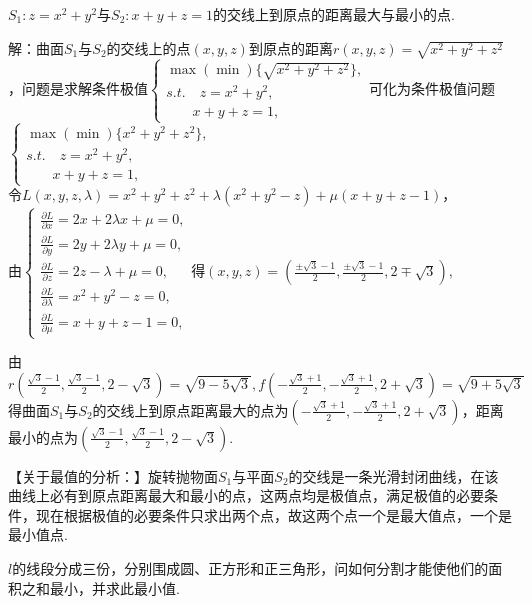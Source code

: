 \documentclass[12pt,UTF8]{ctexart}
\begin{document}
\begin{enumerate}
$S_1:z=x^2+y^2$与$S_2:x+y+z=1$的交线上到原点的距离最大与最小的点.

解：曲面$S_1$与$S_2$的交线上的点$(x,y,z)$到原点的距离$r(x,y,z)=\sqrt{x^2+y^2+z^2}$，问题是求解条件极值$\begin{cases}
\max(\min)\{\sqrt{x^2+y^2+z^2}\},\\
s.t.\quad z=x^2+y^2,\\
\ \ \ \ \quad x+y+z=1,
\end{cases}$可化为条件极值问题$\begin{cases}
\max(\min)\{x^2+y^2+z^2\},\\
s.t.\quad z=x^2+y^2,\\
\ \ \ \ \quad x+y+z=1,
\end{cases}$\\
令$L(x,y,z,\lambda)=x^2+y^2+z^2+\lambda(x^2+y^2-z)+\mu(x+y+z-1)$，\\
由$\begin{cases}
\frac{\partial L}{\partial x}=2x+2\lambda x+\mu=0,\\
\frac{\partial L}{\partial y}=2y+2\lambda y+\mu=0,\\
\frac{\partial L}{\partial z}=2z-\lambda+\mu=0,\\
\frac{\partial L}{\partial\lambda}=x^2+y^2-z=0,\\
\frac{\partial L}{\partial\mu}=x+y+z-1=0,
\end{cases}$得$(x,y,z)=(\frac{\pm\sqrt3-1}2,\frac{\pm\sqrt3-1}2,2\mp\sqrt3)$,

由$r(\frac{\sqrt3-1}2,\frac{\sqrt3-1}2,2-\sqrt3)=\sqrt{9-5\sqrt3},f(-\frac{\sqrt3+1}2,-\frac{\sqrt3+1}2,2+\sqrt3)=\sqrt{9+5\sqrt3}$得曲面$S_1$与$S_2$的交线上到原点距离最大的点为$(-\frac{\sqrt3+1}2,-\frac{\sqrt3+1}2,2+\sqrt3)$，距离最小的点为$(\frac{\sqrt3-1}2,\frac{\sqrt3-1}2,2-\sqrt3)$.

【关于最值的分析：】旋转抛物面$S_1$与平面$S_2$的交线是一条光滑封闭曲线，在该曲线上必有到原点距离最大和最小的点，这两点均是极值点，满足极值的必要条件，现在根据极值的必要条件只求出两个点，故这两个点一个是最大值点，一个是最小值点.

$l$的线段分成三份，分别围成圆、正方形和正三角形，问如何分割才能使他们的面积之和最小，并求此最小值.


\end{enumerate}
\end{document}
